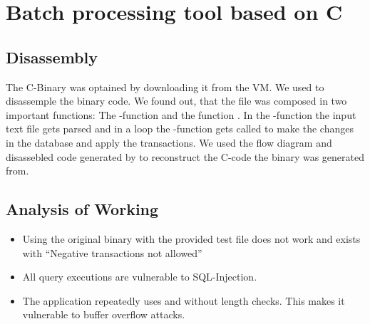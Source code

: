 \section{Batch processing tool based on C}

\subsection{Disassembly}
The C-Binary was optained by downloading it from the VM. We used  to disassemple the binary code.
We found out, that the file was composed in two important functions: The -function and the function . In the -function the input text file gets parsed and in a loop the -function gets called to make the changes in the database and apply the transactions.
We used the flow diagram and disassebled code generated by  to reconstruct the C-code the binary was generated from.

\subsection{Analysis of Working}
\begin{itemize}
\item Using the original binary with the provided test file does not work and exists with \enquote{Negative transactions not allowed}
\item All query executions are vulnerable to SQL-Injection.
\item The application repeatedly uses  and  without length checks. This makes it vulnerable to buffer overflow attacks.
\end{itemize}